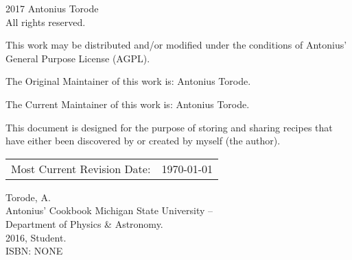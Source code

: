 \pagestyle{empty}
\begingroup
\footnotesize
\parindent 0pt
\parskip \baselineskip
\textcopyright{} 2017 Antonius Torode \\
All rights reserved.

This work may be distributed and/or modified under the conditions of Antonius’ General Purpose License (AGPL).

The Original Maintainer of this work is: Antonius Torode.

The Current Maintainer of this work is: Antonius Torode.

This document is designed for the purpose of storing and sharing recipes that have either been discovered by or created by myself (the author).

\begin{center}
\begin{tabular}{ll}
Most Current Revision Date: &  \today 
\end{tabular}
\end{center}

\vfill

Torode, A.\\
\hspace*{2em} Antonius' Cookbook
\hspace*{2em} Michigan State University -- \\
\hspace*{2em} Department of Physics \& Astronomy. \\
\hspace*{2em} 2016, Student. \\
\hspace*{2em} ISBN: NONE \\



\endgroup
\clearpage